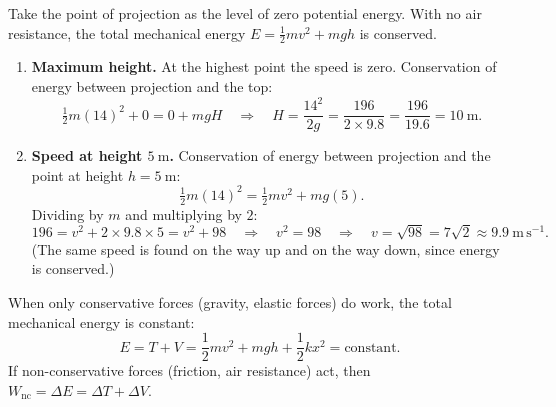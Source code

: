 \documentclass[11pt]{article}
\begin{document}
\begin{corrige}
Take the point of projection as the level of zero potential energy. With no air resistance, the total mechanical energy $E = \tfrac{1}{2}mv^{2} + mgh$ is conserved.

\begin{enumerate}
\item \textbf{Maximum height.} At the highest point the speed is zero. Conservation of energy between projection and the top:
\[
\tfrac{1}{2}m(14)^{2} + 0 = 0 + mgH
\quad\Longrightarrow\quad
H = \frac{14^{2}}{2g} = \frac{196}{2\times 9.8} = \frac{196}{19.6} = 10\ \mathrm{m}.
\]

\item \textbf{Speed at height $5\ \mathrm{m}$.} Conservation of energy between projection and the point at height $h = 5\ \mathrm{m}$:
\[
\tfrac{1}{2}m(14)^{2} = \tfrac{1}{2}mv^{2} + mg(5).
\]
Dividing by $m$ and multiplying by $2$:
\[
196 = v^{2} + 2\times 9.8\times 5 = v^{2} + 98
\quad\Longrightarrow\quad
v^{2} = 98
\quad\Longrightarrow\quad
v = \sqrt{98} = 7\sqrt{2}\approx 9.9\ \mathrm{m\,s^{-1}}.
\]
(The same speed is found on the way up and on the way down, since energy is conserved.)
\end{enumerate}

\begin{propriete}
When only conservative forces (gravity, elastic forces) do work, the total mechanical energy is constant:
\[
E = T + V = \frac{1}{2}mv^2 + mgh + \frac{1}{2}kx^2 = \text{constant}.
\]
If non-conservative forces (friction, air resistance) act, then $W_{\text{nc}} = \Delta E = \Delta T + \Delta V$.
\end{propriete}
\end{corrige}
\end{document}
